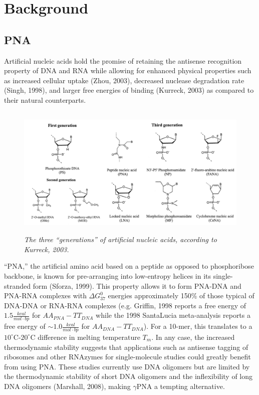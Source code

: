 \documentclass[a4paper,12pt]{article}
\begin{document}
\section{Background}
\subsection{PNA}
Artificial nucleic acids hold the promise of retaining the antisense recognition property of DNA and RNA while allowing for enhanced physical properties such as increased cellular uptake (Zhou, 2003), decreased nuclease degradation rate (Singh, 1998), and larger free energies of binding (Kurreck, 2003) as compared to their natural counterparts.

\begin{figure}[H]
	\includegraphics[height=2.5in]{generations.png}
	\caption{\it The three ``generations'' of artificial nucleic acids, according to Kurreck, 2003.}
\end{figure}

``PNA,'' the artificial amino acid based on a peptide as opposed to phosphoribose backbone, is known for pre-arranging into low-entropy helices in its single-stranded form (Sforza, 1999). This property allows it to form PNA-DNA and PNA-RNA complexes with $\Delta G^0_{37}$ energies approximately 150\% of those typical of DNA-DNA or RNA-RNA complexes (e.g. Griffin, 1998 reports a free energy of $1.5\frac{kcal}{mol\cdot bp}$ for $AA_{PNA}-TT_{DNA}$ while the 1998 SantaLucia meta-analysis reports a free energy of $\sim1.0\frac{kcal}{mol\cdot bp}$ for $AA_{DNA}-TT_{DNA}$). For a 10-mer, this translates to a $10^\circ$C-$20^\circ$C difference in melting temperature $T_m$. In any case, the increased thermodynamic stability suggests that applications such as antisense tagging of ribosomes and other RNAzymes for single-molecule studies could greatly benefit from using PNA. These studies currently use DNA oligomers but are limited by the thermodynamic stability of short DNA oligomers and the inflexibility of long DNA oligomers (Marshall, 2008), making $\gamma$PNA a tempting alternative. 
\end{document}
